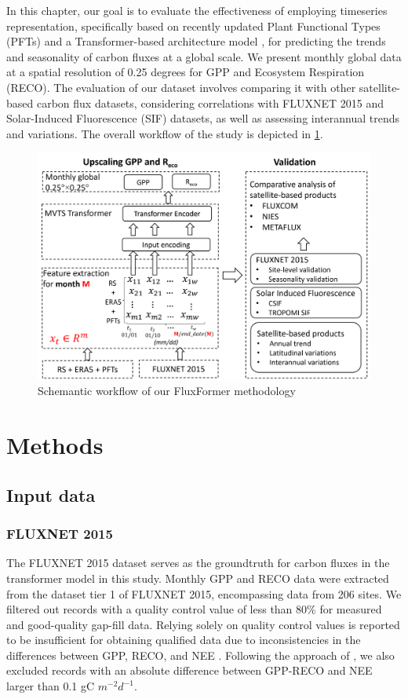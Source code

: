 In this chapter, our goal is to evaluate the effectiveness of employing timeseries representation, specifically based on recently updated Plant Functional Types (PFTs) \citep{harper202229} and a Transformer-based architecture model \citep{zerveas2021transformer}, for predicting the trends and seasonality of carbon fluxes at a global scale. We present monthly global data at a spatial resolution of 0.25 degrees for GPP and Ecosystem Respiration (RECO). The evaluation of our dataset involves comparing it with other satellite-based carbon flux datasets, considering correlations with FLUXNET 2015 and Solar-Induced Fluorescence (SIF) datasets, as well as assessing interannual trends and variations. The overall workflow of the study is depicted in \ref{fig:chap6_fig1}.

\begin{figure}[tbh!]
    \centering
    \includegraphics[width=\textwidth]{figs/chap6/workflow.png}
    \caption[Schemantic workflow of our FluxFormer methodology]{Schemantic workflow of our FluxFormer methodology}
    \label{fig:chap6_fig1}
\end{figure}

\section{Methods}
\subsection{Input data}

\subsubsection*{FLUXNET 2015}
The FLUXNET 2015 dataset \citep{pastorello2020fluxnet2015} serves as the groundtruth for carbon fluxes in the transformer model in this study. Monthly GPP and RECO data were extracted from the dataset tier 1 of FLUXNET 2015, encompassing data from 206 sites. We filtered out records with a quality control value of less than 80\% for measured and good-quality gap-fill data. Relying solely on quality control values is reported to be insufficient for obtaining qualified data due to inconsistencies in the differences between GPP, RECO, and NEE \citep{zeng2020global, tramontana2016predicting}. Following the approach of \citep{zeng2020global}, we also excluded records with an absolute difference between GPP-RECO and NEE larger than 0.1 gC $m^{-2} d^{-1}$.
